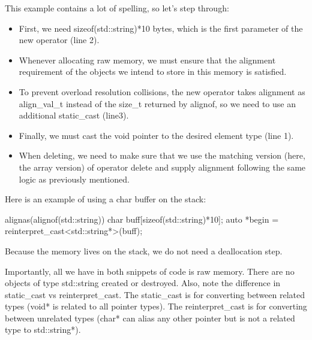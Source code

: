 This example contains a lot of spelling, so let’s step through:

\begin{itemize}
    \item First, we need sizeof(std::string)*10 bytes, which is the first parameter of the new operator (line 2).
    \item Whenever allocating raw memory, we must ensure that the alignment requirement of the objects we intend to store in this memory is satisfied.
    \item To prevent overload resolution collisions, the new operator takes alignment as align\_val\_t instead of the size\_t returned by alignof, so we need to use an additional static\_cast (line3).
    \item Finally, we must cast the void pointer to the desired element type (line 1).
    \item When deleting, we need to make sure that we use the matching version (here, the array version) of operator delete and supply alignment following the same logic as previously mentioned.
\end{itemize}

Here is an example of using a char buffer on the stack:

\begin{codebox}
\begin{cppcode}
alignas(alignof(std::string)) char buff[sizeof(std::string)*10];
auto *begin = reinterpret_cast<std::string*>(buff);
\end{cppcode}
\end{codebox}

Because the memory lives on the stack, we do not need a deallocation step.

Importantly, all we have in both snippets of code is raw memory. There are no objects of type std::string created or destroyed. Also, note the difference in static\_cast vs reinterpret\_cast. The static\_cast is for converting between related types (void* is related to all pointer types). The reinterpret\_cast is for converting between unrelated types (char* can alias any other pointer but is not a related type to std::string*).